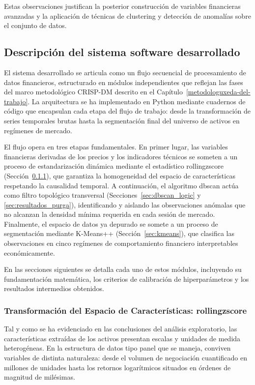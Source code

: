 \documentclass[
]{article}
\begin{document}
Estas observaciones justifican la posterior construcción de variables financieras avanzadas y la aplicación de técnicas de \gls{clustering} y detección de anomalías sobre el conjunto de datos.

\subsection{Descripción del sistema software desarrollado}
\label{sec:descripcion_sistema}

El sistema desarrollado se articula como un flujo secuencial de 
procesamiento de datos financieros, estructurado en módulos 
independientes que reflejan las fases del marco metodológico 
CRISP-DM descrito en el Capítulo~\ref{metodologuxeda-del-trabajo}. 
La arquitectura se ha implementado en Python mediante cuadernos de 
código que encapsulan cada etapa del flujo de trabajo: desde la 
transformación de series temporales brutas hasta la segmentación 
final del universo de activos en regímenes de mercado.

El flujo opera en tres etapas fundamentales. En primer lugar, 
las variables financieras derivadas de los precios y los indicadores 
técnicos se someten a un proceso de estandarización dinámica mediante 
el estadístico \gls{rollingzscore} (Sección~\ref{sec:rolling_zscore}), 
que garantiza la homogeneidad del espacio de características 
respetando la causalidad temporal. A continuación, el algoritmo 
\gls{dbscan} actúa como filtro topológico transversal 
(Secciones~\ref{sec:dbscan_logic} y \ref{sec:resultados_purga}), 
identificando y aislando las observaciones anómalas que no alcanzan 
la densidad mínima requerida en cada sesión de mercado. Finalmente, 
el espacio de datos ya depurado se somete a un proceso de segmentación 
mediante K-Means++ (Sección~\ref{sec:kmeans}), que clasifica las 
observaciones en cinco regímenes de comportamiento financiero 
interpretables económicamente.

En las secciones siguientes se detalla cada uno de estos módulos, 
incluyendo su fundamentación matemática, los criterios de calibración 
de hiperparámetros y los resultados intermedios obtenidos.

\subsubsection{Transformación del Espacio de Características: \gls{rollingzscore}}
\label{sec:rolling_zscore}

Tal y como se ha evidenciado en las conclusiones del análisis exploratorio, las características extraídas de los activos presentan escalas y unidades de medida heterogéneas. En la estructura de datos tipo panel que se maneja, conviven variables de distinta naturaleza: desde el volumen de negociación cuantificado en millones de unidades hasta los retornos logarítmicos situados en órdenes de magnitud de milésimas.
\end{document}
